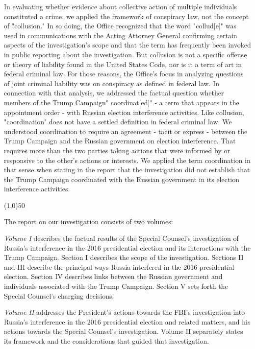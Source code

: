 \documentclass{article}
\newcommand{\hr}{\begin{center} \line(1,0){50} \end{center}}
\begin{document}
In evaluating whether evidence about collective action of multiple individuals constituted a crime, we applied the framework of conspiracy law, not the concept of "collusion."
In so doing, the Office recognized that the word "collud[e]" was used in communications with the Acting Attorney General confirming certain aspects of the investigation's scope and that the term has frequently been invoked in public reporting about the investigation.
But collusion is not a specific offense or theory of liability found in the United States Code, nor is it a term of art in federal criminal law.
For those reasons, the Office's focus in analyzing questions of joint criminal liability was on conspiracy as defined in federal law.
In connection with that analysis, we addressed the factual question whether members of the Trump Campaign" coordinat[ed]" - a term that appears in the appointment order - with Russian election interference activities.
Like collusion, "coordination" does not have a settled definition in federal criminal law.
We understood coordination to require an agreement - tacit or express - between the Trump Campaign and the Russian government on election interference.
That requires more than the two parties taking actions that were informed by or responsive to the other's actions or interests.
We applied the term coordination in that sense when stating in the report that the investigation did not establish that the Trump Campaign coordinated with the Russian government in its election interference activities.

\hr

The report on our investigation consists of two volumes:

\textit{Volume I} describes the factual results of the Special Counsel's investigation of Russia's interference in the 2016 presidential election and its interactions with the Trump Campaign.
Section I describes the scope of the investigation.
Sections II and III describe the principal ways Russia interfered in the 2016 presidential election.
Section IV describes links between the Russian government and individuals associated with the Trump Campaign.
Section V sets forth the Special Counsel's charging decisions.

\textit{Volume II} addresses the President's actions towards the FBI's investigation into Russia's interference in the 2016 presidential election and related matters, and his actions towards the Special Counsel's investigation.
Volume II separately states its framework and the considerations that guided that investigation.
\end{document}
